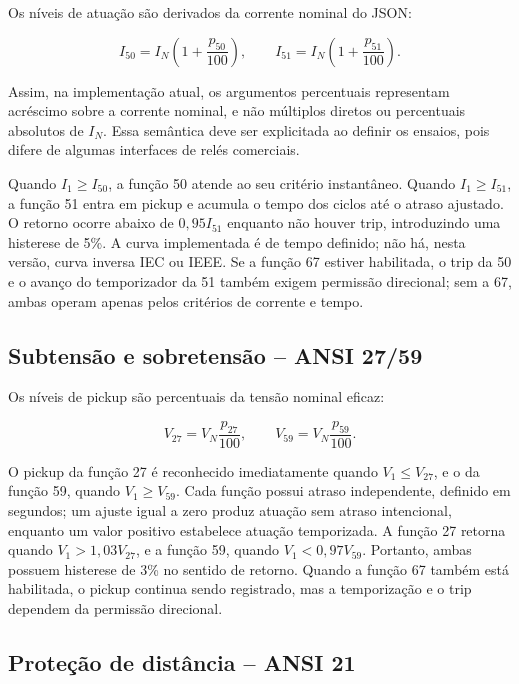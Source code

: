 Os níveis de atuação são derivados da corrente nominal do JSON:

\begin{equation}
  I_{50}=I_N\left(1+\frac{p_{50}}{100}\right), \qquad
  I_{51}=I_N\left(1+\frac{p_{51}}{100}\right).
  \label{eq:pickup-sobrecorrente}
\end{equation}

Assim, na implementação atual, os argumentos percentuais representam acréscimo sobre a corrente nominal, e não múltiplos diretos ou percentuais absolutos de $I_N$. Essa semântica deve ser explicitada ao definir os ensaios, pois difere de algumas interfaces de relés comerciais.

Quando $I_1\geq I_{50}$, a função 50 atende ao seu critério instantâneo. Quando $I_1\geq I_{51}$, a função 51 entra em pickup e acumula o tempo dos ciclos até o atraso ajustado. O retorno ocorre abaixo de $0{,}95I_{51}$ enquanto não houver trip, introduzindo uma histerese de 5\%. A curva implementada é de tempo definido; não há, nesta versão, curva inversa IEC ou IEEE. Se a função 67 estiver habilitada, o trip da 50 e o avanço do temporizador da 51 também exigem permissão direcional; sem a 67, ambas operam apenas pelos critérios de corrente e tempo.

\subsection{Subtensão e sobretensão -- ANSI 27/59}

Os níveis de pickup são percentuais da tensão nominal eficaz:

\begin{equation}
  V_{27}=V_N\frac{p_{27}}{100}, \qquad
  V_{59}=V_N\frac{p_{59}}{100}.
\end{equation}

O pickup da função 27 é reconhecido imediatamente quando $V_1\leq V_{27}$, e o da função 59, quando $V_1\geq V_{59}$. Cada função possui atraso independente, definido em segundos; um ajuste igual a zero produz atuação sem atraso intencional, enquanto um valor positivo estabelece atuação temporizada. A função 27 retorna quando $V_1>1{,}03V_{27}$, e a função 59, quando $V_1<0{,}97V_{59}$. Portanto, ambas possuem histerese de 3\% no sentido de retorno. Quando a função 67 também está habilitada, o pickup continua sendo registrado, mas a temporização e o trip dependem da permissão direcional.

\subsection{Proteção de distância -- ANSI 21}

